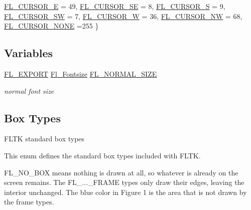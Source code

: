 \begin{Indent}
\begin{DoxyCompactItemize}
\hyperlink{_enumerations_8_h_a72bde974edc7926b1217dd51b8c7e8e0a655675f4a5c1009798c4688811f7aef8}{F\+L\+\_\+\+C\+U\+R\+S\+O\+R\+\_\+E} = 49, 
\hyperlink{_enumerations_8_h_a72bde974edc7926b1217dd51b8c7e8e0a20e02baa5891403ea99e770525dcb906}{F\+L\+\_\+\+C\+U\+R\+S\+O\+R\+\_\+\+SE} = 8, 
\newline
\hyperlink{_enumerations_8_h_a72bde974edc7926b1217dd51b8c7e8e0ae346bec5544ac09f2ac846f37fc802dd}{F\+L\+\_\+\+C\+U\+R\+S\+O\+R\+\_\+S} = 9, 
\hyperlink{_enumerations_8_h_a72bde974edc7926b1217dd51b8c7e8e0ac556babff2b1387a1139f07c7361a8f5}{F\+L\+\_\+\+C\+U\+R\+S\+O\+R\+\_\+\+SW} = 7, 
\hyperlink{_enumerations_8_h_a72bde974edc7926b1217dd51b8c7e8e0a3e71103dc03ff53a2a53be5e7e4b19eb}{F\+L\+\_\+\+C\+U\+R\+S\+O\+R\+\_\+W} = 36, 
\hyperlink{_enumerations_8_h_a72bde974edc7926b1217dd51b8c7e8e0a414ffb070f3fbcd0a97dafdaa6b718f7}{F\+L\+\_\+\+C\+U\+R\+S\+O\+R\+\_\+\+NW} = 68, 
\newline
\hyperlink{_enumerations_8_h_a72bde974edc7926b1217dd51b8c7e8e0a4bc466fe5135272bccedd6b8f97156c7}{F\+L\+\_\+\+C\+U\+R\+S\+O\+R\+\_\+\+N\+O\+NE} =255
 \}
\end{DoxyCompactItemize}
\end{Indent}
\subsection*{Variables}
\begin{DoxyCompactItemize}
\item 
\hyperlink{_fl___export_8_h_aa9ba29a18aee9d738370a06eeb4470fc}{F\+L\+\_\+\+E\+X\+P\+O\+RT} \hyperlink{_enumerations_8_h_ad58927f5c691454480f7cd28362502f1}{Fl\+\_\+\+Fontsize} \hyperlink{_enumerations_8_h_a200c616eb9f1a5d32a0b79847cef8cc8}{F\+L\+\_\+\+N\+O\+R\+M\+A\+L\+\_\+\+S\+I\+ZE}
\begin{DoxyCompactList}\small\item\em normal font size \end{DoxyCompactList}\end{DoxyCompactItemize}
\subsection*{Box Types}
\label{_amgrp2126f69af9d5d7bac9ff67a532026acc}%
F\+L\+TK standard box types

This enum defines the standard box types included with F\+L\+TK.

F\+L\+\_\+\+N\+O\+\_\+\+B\+OX means nothing is drawn at all, so whatever is already on the screen remains. The F\+L\+\_\+...\+\_\+\+F\+R\+A\+ME types only draw their edges, leaving the interior unchanged. The blue color in Figure 1 is the area that is not drawn by the frame types.


